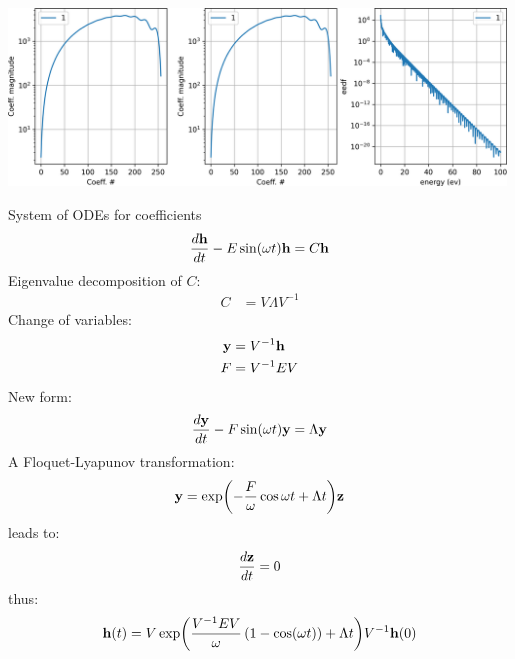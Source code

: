 \documentclass{article}[draft]
\begin{document}
\includegraphics[width=0.99\textwidth]{fig/steady_state_elastic_only.png}

\newpage
System of ODEs for coefficients
\begin{align*}
\frac{d \vect{h}}{dt} - E \sin\of{\omega t} \vect{h} = C \vect{h}
\end{align*}
Eigenvalue decomposition of $C$:
\begin{align*}
C &= V \Lambda V^{-1}
\end{align*}
Change of variables:
\begin{align*}
\mathbf{y} &= V^{-1} \mathbf{h} \\
F &= V^{-1} E V
\end{align*}
New form:
\begin{align*}
\frac{d \vect{y}}{dt} - F \sin\of{\omega t} \vect{y} = \Lambda \vect{y}
\end{align*}
A Floquet-Lyapunov transformation:
\begin{align*}
\vect{y} = \exp\of{-\frac{F}{\omega} \cos{\omega t} + \Lambda t} \vect{z}
\end{align*}
leads to:
\begin{align*}
\frac{d \mathbf{z}}{dt} = 0
\end{align*}
thus:
\begin{align*}
\vect{h}\of{t} = V \exp\of{\frac{V^{-1} E V}{\omega}  \left(1 - \cos\of{\omega t} \right) + \Lambda t} V^{-1} \vect{h}\of{0}
\end{align*}
\end{document}
